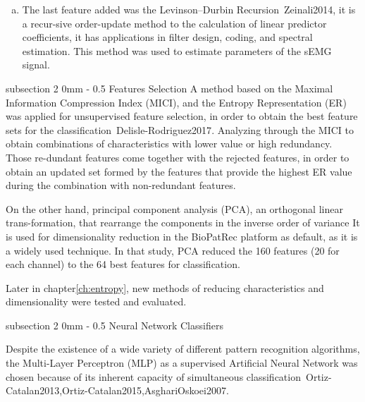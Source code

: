 \documentclass[a4paper, 12pt]{ppgeb}
\makeatletter
\renewcommand{\subsection}{\@startsection
{subsection}
{2}
{0mm}
{-\baselineskip}
{0.5\baselineskip}
{\bf\sffamily}}
\makeatother
\begin{document}
\begin{enumerate}[(a)]
    The exp. variable can assume one of two possible values (0.50 or 0.75) based on the characteristic of the EMG signal segment under analysis. The \ac{ASM} is therefore determined in the following three steps: first the summation of the expth root of all values in a given analysis window is computed; followed by the mean of the resultant values; and lastly, the absolute value of the resultant mean is evaluated.

    \item The last feature added was the Levinson–Durbin Recursion~\cite{mainreferences}{Zeinali2014}, it is a recur-sive order-update method to the calculation of linear predictor coefficients, it has applications in filter design, coding, and spectral estimation. This method was used to estimate parameters of the \ac{sEMG} signal.
\end{enumerate}

\subsection{Features Selection}
A method based on the Maximal Information Compression Index (\ac{MICI}), and the Entropy Representation (\ac{ER}) was applied for unsupervised feature selection, in order to obtain the best feature sets for the classification~\cite{mainreferences}{Delisle-Rodriguez2017}. Analyzing through the \ac{MICI} to obtain combinations of characteristics with lower value or high redundancy. Those re-dundant features come together with the rejected features, in order to obtain an updated set formed by the features that provide the highest \ac{ER} value during the combination with non-redundant features.

On the other hand, principal component analysis (\ac{PCA}), an orthogonal linear trans-formation, that rearrange the components in the inverse order of variance It is used for dimensionality reduction in the BioPatRec platform as default, as it is a widely used technique.
In that study, \ac{PCA} reduced the 160 features (20 for each channel) to the 64 best features for classification.

Later in chapter\ref{ch:entropy}, new methods of reducing characteristics and dimensionality were tested and evaluated.

\subsection{Neural Network Classifiers}

Despite the existence of a wide variety of different pattern recognition algorithms, the Multi-Layer Perceptron (\ac{MLP}) as a supervised Artificial Neural Network was chosen because of its inherent capacity of simultaneous classification~\cite{mainreferences}{Ortiz-Catalan2013,Ortiz-Catalan2015,AsghariOskoei2007}.
\end{document}
